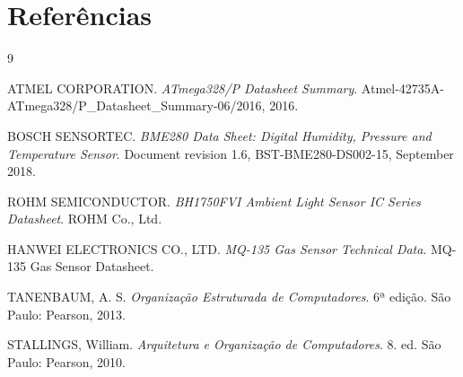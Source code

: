 \documentclass[a4paper,12pt]{article}
\begin{document}
\section{Referências}
\begin{thebibliography}{9}

ATMEL CORPORATION. \textit{ATmega328/P Datasheet Summary}. 
Atmel-42735A-ATmega328/P\_Datasheet\_Summary-06/2016, 2016.

BOSCH SENSORTEC. \textit{BME280 Data Sheet: Digital Humidity, Pressure and Temperature Sensor}. 
Document revision 1.6, BST-BME280-DS002-15, September 2018.

ROHM SEMICONDUCTOR. \textit{BH1750FVI Ambient Light Sensor IC Series Datasheet}. 
ROHM Co., Ltd.

HANWEI ELECTRONICS CO., LTD. \textit{MQ-135 Gas Sensor Technical Data}. 
MQ-135 Gas Sensor Datasheet.

TANENBAUM, A. S. \textit{Organização Estruturada de Computadores}. 6ª edição. São Paulo: Pearson, 2013.

STALLINGS, William. \textit{Arquitetura e Organização de Computadores}. 8. ed. São Paulo: Pearson, 2010.

\end{thebibliography}
\end{document}
